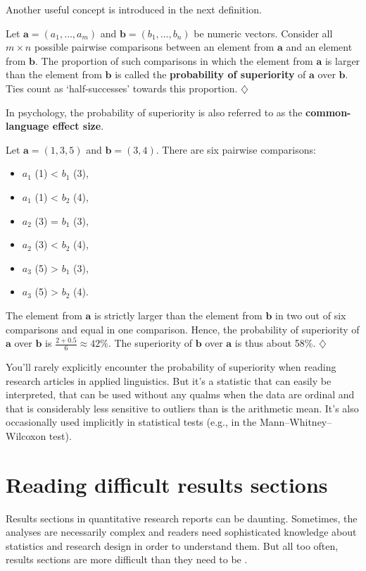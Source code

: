 \documentclass[a4paper]{tufte-book}\usepackage[]{graphicx}\usepackage[]{xcolor}
\newcommand{\term}[1]{\textbf{#1}}
\newcommand*{\parend}[1][$\diamondsuit$]{%
  \unskip\nobreak\hspace{1em plus 1fill}$\diamondsuit$%
}
\begin{document}
Another useful concept is introduced in the next definition.

\label{def:probsup}
Let $\bm a = (a_1, \dots, a_m)$ and $\bm b = (b_1, \dots, b_n)$
be numeric vectors.
Consider all $m \times n$ possible pairwise comparisons between an element 
from $\bm a$ and an element from $\bm b$.
The proportion of such comparisons in which the element from $\bm a$
is larger than the element from $\bm b$ is called the \term{probability of superiority}
of $\bm a$ over $\bm b$.
Ties count as `half-successes' towards this proportion.
\parend

In psychology, the probability of superiority is also referred to
as the \term{common-language effect size}.

  Let $\bm a = (1, 3, 5)$ and $\bm b = (3, 4)$.
  There are six pairwise comparisons:
  \begin{itemize}
    \item $a_1$ (1) < $b_1$ (3),
    \item $a_1$ (1) < $b_2$ (4),
    \item $a_2$ (3) = $b_1$ (3),
    \item $a_2$ (3) < $b_2$ (4),
    \item $a_3$ (5) > $b_1$ (3),
    \item $a_3$ (5) > $b_2$ (4).
  \end{itemize}
  The element from $\bm a$ is strictly larger than the element
  from $\bm b$ in two out of six comparisons
  and equal in one comparison.
  Hence, the probability of superiority of $\bm a$ over $\bm b$ is
  $\frac{2 + 0.5}{6} \approx 42\%$.
  The superiority of $\bm b$ over $\bm a$ is thus about 58\%.
\parend
\medskip

You'll rarely explicitly encounter the probability of superiority 
when reading research articles in applied linguistics.
But it's a statistic that can easily be interpreted,
that can be used without any qualms when the data are ordinal
and 
that is considerably less sensitive to outliers than is the arithmetic mean.
It's also occasionally used implicitly in statistical tests
(e.g., in the Mann--Whitney--Wilcoxon test).

\chapter{Reading difficult results sections}
Results sections in quantitative research reports can be daunting.
Sometimes, the analyses are necessarily complex 
and readers need sophisticated knowledge about statistics and research
design in order to understand them.
But all too often, results sections are more difficult than they need
to be \citep[see][]{Vanhove2020b}. 
\end{document}
